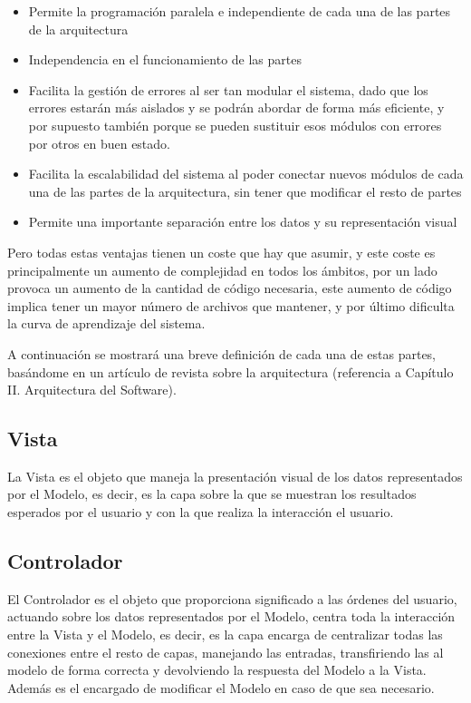 \begin{itemize}
    \item Permite la programación paralela e independiente de cada una de las partes de la arquitectura
    \item Independencia en el funcionamiento de las partes
    \item Facilita la gestión de errores al ser tan modular el sistema, dado que los errores estarán más aislados y se podrán abordar de forma más eficiente, y por supuesto también porque se pueden sustituir esos módulos con errores por otros en buen estado.
    \item Facilita la escalabilidad del sistema al poder conectar nuevos módulos de cada una de las partes de la arquitectura, sin tener que modificar el resto de partes
    \item Permite una importante separación entre los datos y su representación visual
\end{itemize}

Pero todas estas ventajas tienen un coste que hay que asumir, y este coste es principalmente un aumento de complejidad en todos los ámbitos, por un lado provoca un aumento de la cantidad de código necesaria, este aumento de código implica tener un mayor número de archivos que mantener, y por último dificulta la curva de aprendizaje del sistema.

A continuación se mostrará una breve definición de cada una de estas partes, basándome en un artículo de revista sobre la arquitectura (referencia a Capítulo II. Arquitectura del Software).

\subsection*{Vista}

La Vista es el objeto que maneja la presentación visual de los datos representados por el Modelo, es decir, es la capa sobre la que se muestran los resultados esperados por el usuario y con la que realiza la interacción el usuario.

\subsection*{Controlador}

El Controlador es el objeto que proporciona significado a las órdenes del usuario, actuando sobre los datos representados por el Modelo, centra toda la interacción entre la Vista y el Modelo, es decir, es la capa encarga de centralizar todas las conexiones entre el resto de capas, manejando las entradas, transfiriendo las al modelo de forma correcta y devolviendo la respuesta del Modelo a la Vista. Además es el encargado de modificar el Modelo en caso de que sea necesario.

